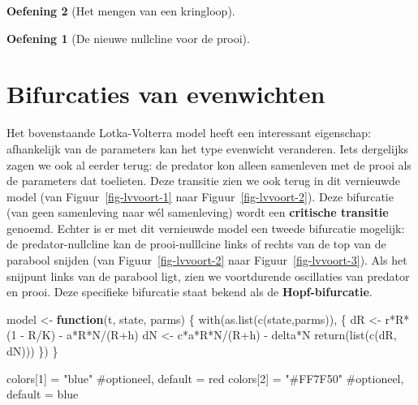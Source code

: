 \documentclass[
  a4paper,
]{scrbook}
\newenvironment{Shaded}{\begin{snugshade}}{\end{snugshade}}
\newcommand{\CommentTok}[1]{\textcolor[rgb]{0.37,0.37,0.37}{#1}}
\newcommand{\ControlFlowTok}[1]{\textcolor[rgb]{0.00,0.23,0.31}{\textbf{#1}}}
\newcommand{\DecValTok}[1]{\textcolor[rgb]{0.68,0.00,0.00}{#1}}
\newcommand{\FunctionTok}[1]{\textcolor[rgb]{0.28,0.35,0.67}{#1}}
\newcommand{\NormalTok}[1]{\textcolor[rgb]{0.00,0.23,0.31}{#1}}
\newcommand{\OtherTok}[1]{\textcolor[rgb]{0.00,0.23,0.31}{#1}}
\newcommand{\SpecialCharTok}[1]{\textcolor[rgb]{0.37,0.37,0.37}{#1}}
\newcommand{\StringTok}[1]{\textcolor[rgb]{0.13,0.47,0.30}{#1}}
\theoremstyle{definition}
\newtheorem{exercise}{Oefening}[chapter]
\theoremstyle{remark}
\begin{document}
\begin{exercise}[Het mengen van een
kringloop]
\begin{exercise}[De nieuwe nullcline voor de
prooi]
\end{exercise}

\section{Bifurcaties van evenwichten}\label{bifurcaties-van-evenwichten}

Het bovenstaande Lotka-Volterra model heeft een interessant eigenschap:
afhankelijk van de parameters kan het type evenwicht veranderen. Iets
dergelijks zagen we ook al eerder terug: de predator kon alleen
samenleven met de prooi als de parameters dat toelieten. Deze transitie
zien we ook terug in dit vernieuwde model (van
Figuur~\ref{fig-lvvoort-1} naar Figuur~\ref{fig-lvvoort-2}). Deze
bifurcatie (van geen samenleving naar wél samenleving) wordt een
\textbf{critische transitie} genoemd. Echter is er met dit vernieuwde
model een tweede bifurcatie mogelijk: de predator-nullcline kan de
prooi-nulllcine links of rechts van de top van de parabool snijden (van
Figuur~\ref{fig-lvvoort-2} naar Figuur~\ref{fig-lvvoort-3}). Als het
snijpunt links van de parabool ligt, zien we voortdurende oscillaties
van predator en prooi. Deze specifieke bifurcatie staat bekend als de
\textbf{Hopf-bifurcatie}.

\begin{Shaded}
\begin{Highlighting}[]
\NormalTok{model }\OtherTok{\textless{}{-}} \ControlFlowTok{function}\NormalTok{(t, state, parms) \{}
  \FunctionTok{with}\NormalTok{(}\FunctionTok{as.list}\NormalTok{(}\FunctionTok{c}\NormalTok{(state,parms)), \{}
\NormalTok{    dR }\OtherTok{\textless{}{-}}\NormalTok{ r}\SpecialCharTok{*}\NormalTok{R}\SpecialCharTok{*}\NormalTok{(}\DecValTok{1} \SpecialCharTok{{-}}\NormalTok{ R}\SpecialCharTok{/}\NormalTok{K) }\SpecialCharTok{{-}}\NormalTok{ a}\SpecialCharTok{*}\NormalTok{R}\SpecialCharTok{*}\NormalTok{N}\SpecialCharTok{/}\NormalTok{(R}\SpecialCharTok{+}\NormalTok{h)}
\NormalTok{    dN }\OtherTok{\textless{}{-}}\NormalTok{ c}\SpecialCharTok{*}\NormalTok{a}\SpecialCharTok{*}\NormalTok{R}\SpecialCharTok{*}\NormalTok{N}\SpecialCharTok{/}\NormalTok{(R}\SpecialCharTok{+}\NormalTok{h) }\SpecialCharTok{{-}}\NormalTok{ delta}\SpecialCharTok{*}\NormalTok{N}
    \FunctionTok{return}\NormalTok{(}\FunctionTok{list}\NormalTok{(}\FunctionTok{c}\NormalTok{(dR, dN)))  }
\NormalTok{  \}) }
\NormalTok{\}  }

\NormalTok{colors[}\DecValTok{1}\NormalTok{] }\OtherTok{=} \StringTok{"blue"} \CommentTok{\#optioneel, default = \textquotesingle{}red\textquotesingle{}}
\NormalTok{colors[}\DecValTok{2}\NormalTok{] }\OtherTok{=} \StringTok{"\#FF7F50"} \CommentTok{\#optioneel, default = \textquotesingle{}blue\textquotesingle{}}


\end{Highlighting}
\end{Shaded}
\end{exercise}
\end{document}
